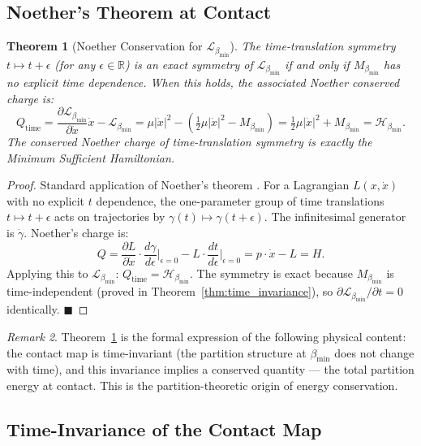 \documentclass[11pt,twocolumn,a4paper]{article}
\theoremstyle{plain}
\newtheorem{theorem}{Theorem}[section]
\theoremstyle{definition}
\theoremstyle{remark}
\newtheorem{remark}[theorem]{Remark}
\newcommand{\bmin}{\beta_{\min}}
\newcommand{\Lmin}{\mathcal{L}_{\bmin}}
\newcommand{\Hmin}{\mathcal{H}_{\bmin}}
\newcommand{\reals}{\mathbb{R}}
\newcommand{\half}{\tfrac{1}{2}}
\renewcommand{\qed}{\hfill$\blacksquare$}
\begin{document}
\subsection{Noether's Theorem at Contact}

\begin{theorem}[Noether Conservation for $\Lmin$]
\label{thm:noether}
The time-translation symmetry $t \mapsto t + \epsilon$ (for any $\epsilon \in
\reals$) is an exact symmetry of $\Lmin$ if and only if $M_{\bmin}$ has no
explicit time dependence. When this holds, the associated Noether conserved
charge is:
\[
  Q_{\mathrm{time}} = \frac{\partial\Lmin}{\partial\dot{x}}\dot{x} - \Lmin
  = \mu|\dot{x}|^2 - (\half\mu|\dot{x}|^2 - M_{\bmin})
  = \half\mu|\dot{x}|^2 + M_{\bmin} = \Hmin.
\]
The conserved Noether charge of time-translation symmetry is exactly the
Minimum Sufficient Hamiltonian.
\end{theorem}

\begin{proof}
Standard application of Noether's theorem \citep{noether1918invariante}. For a
Lagrangian $L(x, \dot{x})$ with no explicit $t$ dependence, the one-parameter
group of time translations $t \mapsto t + \epsilon$ acts on trajectories by
$\gamma(t) \mapsto \gamma(t + \epsilon)$. The infinitesimal generator is
$\dot{\gamma}$. Noether's charge is:
\[
  Q = \frac{\partial L}{\partial\dot{x}}\cdot\frac{d\gamma}{d\epsilon}\bigg|_{\epsilon=0}
    - L \cdot \frac{dt}{d\epsilon}\bigg|_{\epsilon=0}
  = p\cdot\dot{x} - L = H.
\]
Applying this to $\Lmin$: $Q_{\mathrm{time}} = \Hmin$. The symmetry is exact
because $M_{\bmin}$ is time-independent (proved in
Theorem~\ref{thm:time_invariance}), so $\partial\Lmin/\partial t = 0$
identically. \qed
\end{proof}

\begin{remark}
Theorem~\ref{thm:noether} is the formal expression of the following physical
content: the contact map is time-invariant (the partition structure at $\bmin$
does not change with time), and this invariance implies a conserved quantity
--- the total partition energy at contact. This is the partition-theoretic origin
of energy conservation.
\end{remark}

\subsection{Time-Invariance of the Contact Map}
\label{sec:time_invariance}
\end{document}
